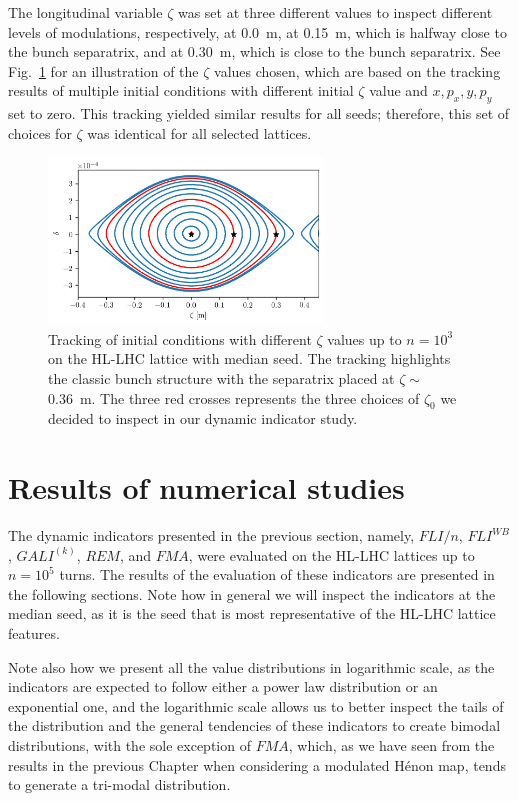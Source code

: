 The longitudinal variable $\zeta$ was set at three different values to inspect different levels of modulations, respectively, at \SI{0.0}{\meter}, at \SI{0.15}{\meter}, which is halfway close to the bunch separatrix, and at \SI{0.30}{\meter}, which is close to the bunch separatrix. See Fig.~\ref{fig:the_bunch} for an illustration of the $\zeta$ values chosen, which are based on the tracking results of multiple initial conditions with different initial $\zeta$ value and $x, p_x, y, p_y$ set to zero. This tracking yielded similar results for all seeds; therefore, this set of choices for $\zeta$ was identical for all selected lattices.

\begin{figure}
    \centering
    \includegraphics[width=0.65\textwidth]{6_lhc_dynamic_indicators/figs/longitudinal.png}
    \caption{Tracking of initial conditions with different $\zeta$ values up to $n=10^3$ on the HL-LHC lattice with median seed. The tracking highlights the classic bunch structure with the separatrix placed at $\zeta \sim$ \SI{0.36}{\meter}. The three red crosses represents the three choices of $\zeta_0$ we decided to inspect in our dynamic indicator study.}
    \label{fig:the_bunch}
\end{figure}

\section{Results of numerical studies} \label{sec:results}

The dynamic indicators presented in the previous section, namely, $FLI/n$, $FLI^{WB}$, $GALI^{(k)}$, $REM$, and $FMA$, were evaluated on the HL-LHC lattices up to $n=10^5$ turns. The results of the evaluation of these indicators are presented in the following sections. Note how in general we will inspect the indicators at the median seed, as it is the seed that is most representative of the HL-LHC lattice features.

Note also how we present all the value distributions in logarithmic scale, as the indicators are expected to follow either a power law distribution or an exponential one, and the logarithmic scale allows us to better inspect the tails of the distribution and the general tendencies of these indicators to create bimodal distributions, with the sole exception of $FMA$, which, as we have seen from the results in the previous Chapter when considering a modulated Hénon map, tends to generate a tri-modal distribution.


